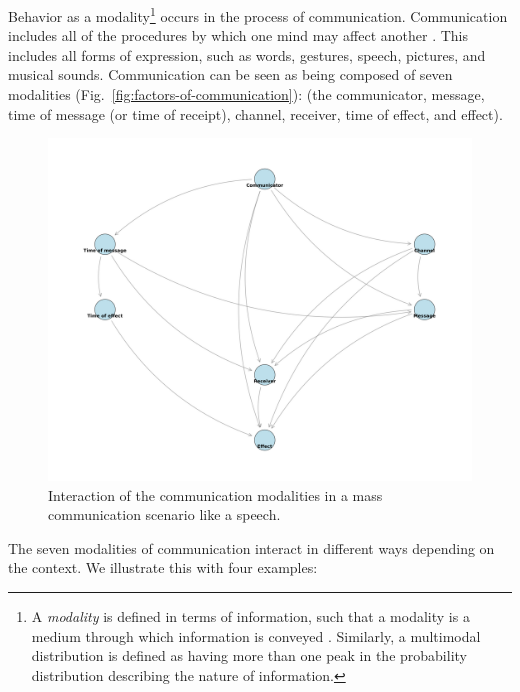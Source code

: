Behavior as a modality\footnote{A \textit{modality} is defined in terms of information, such that a modality is a medium through which information is conveyed \cite{liang2022foundations,grifoni2009multimodal,martin2001annotation}. Similarly, a multimodal distribution is defined as having more than one peak in the probability distribution describing the nature of information.} occurs in the process of communication. Communication includes all of the procedures by which one mind may affect another \cite{shannon-weaver-1949}. This includes all forms of expression, such as words, gestures, speech, pictures, and musical sounds. Communication can be seen as being composed of seven modalities (Fig.~\ref{fig:factors-of-communication}): (the communicator, message, time of message (or time of receipt), channel, receiver, time of effect, and effect). 


\begin{figure}[!t]
    \centering
    \includegraphics[width=1.0\textwidth]{images/pgm_mass_communication_speech.png}
    \caption{Interaction of the communication modalities in a mass communication scenario like a speech.
    \label{fig:factors-of-communication-speech}}
  \end{figure}

  

The seven modalities of communication interact in different ways depending on the context. We illustrate this with four examples:

